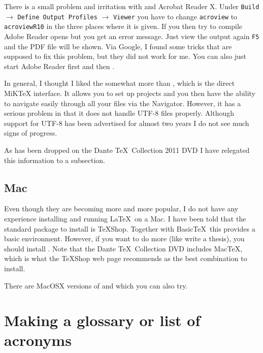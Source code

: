 There is a small problem and irritation with \TeXnicCenter and
Acrobat Reader X. Under \texttt{Build} $\to$ \texttt{Define Output
  Profiles} $\to$ \texttt{Viewer} you have to change \texttt{acroview} to
\texttt{acroviewR10} in the three places where it is given. If you
then try to compile Adobe Reader opens but you get an error
message. Just view the output again \texttt{F5} and the PDF file will
be shown. Via Google, I found some tricks that are supposed to fix
this problem, but they did not work for me. You can also just start
Adobe Reader first and then \TeXnicCenter.

In general, I thought I liked the \TeXnicCenter somewhat more than
\TeXworks, which is the direct MiK\TeX{} interface. It allows you to
set up projects and you then have the ability to navigate easily
through all your files via the Navigator. However, it has a serious
problem in that it does not handle UTF-8 files properly. Although
support for UTF-8 has been advertised for almost two years I do not
see much signs of progress.

As \TeXnicCenter has been dropped on the Dante \TeX\ Collection 2011
DVD I have relegated this information to a subsection.


\section{Mac}
\label{sec:app:mac}

Even though they are becoming more and more popular, I do not have any
experience installing and running \LaTeX\ on a Mac. I have been told
that the standard package to install is \TeX Shop. Together with
Basic\TeX\ this provides a basic
environment. However, if you want to do more (like write a thesis),
you should install \TeXLive. Note that the Dante \TeX\
Collection DVD includes Mac\TeX, which is what the \TeX Shop web page
recommends as the best combination to install.

There are MacOSX versions of \TeXstudio and \TeXmaker which you can
also try.


\chapter{Making a glossary or list of acronyms}
\label{sec:app:glossary}

